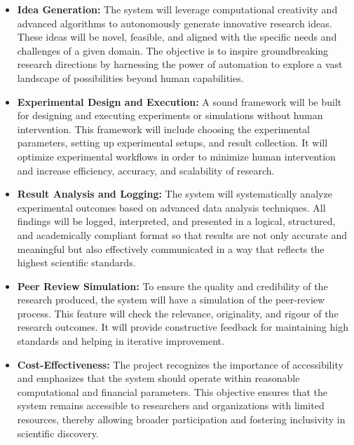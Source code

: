 \begin{itemize}
    \item \textbf{Idea Generation:} The system will leverage computational creativity and advanced algorithms to autonomously generate innovative research ideas. These ideas will be novel, feasible, and aligned with the specific needs and challenges of a given domain. The objective is to inspire groundbreaking research directions by harnessing the power of automation to explore a vast landscape of possibilities beyond human capabilities.

    \item \textbf{Experimental Design and Execution:} A sound framework will be built for designing and executing experiments or simulations without human intervention. This framework will include choosing the experimental parameters, setting up experimental setups, and result collection. It will optimize experimental workflows in order to minimize human intervention and increase efficiency, accuracy, and scalability of research.

    \item \textbf{Result Analysis and Logging:} The system will systematically analyze experimental outcomes based on advanced data analysis techniques. All findings will be logged, interpreted, and presented in a logical, structured, and academically compliant format so that results are not only accurate and meaningful but also effectively communicated in a way that reflects the highest scientific standards.

    \item \textbf{Peer Review Simulation:} To ensure the quality and credibility of the research produced, the system will have a simulation of the peer-review process. This feature will check the relevance, originality, and rigour of the research outcomes. It will provide constructive feedback for maintaining high standards and helping in iterative improvement.

    \item \textbf{Cost-Effectiveness:} The project recognizes the importance of accessibility and emphasizes that the system should operate within reasonable computational and financial parameters. This objective ensures that the system remains accessible to researchers and organizations with limited resources, thereby allowing broader participation and fostering inclusivity in scientific discovery.
\end{itemize}

